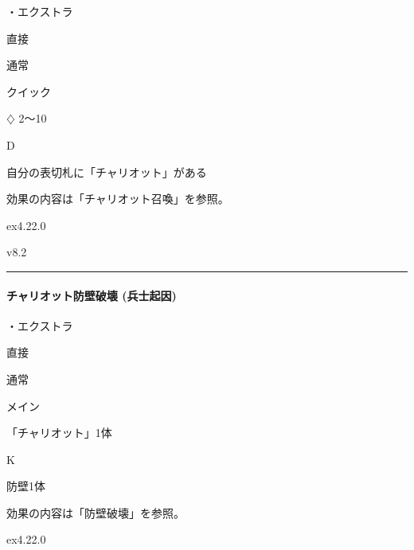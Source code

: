 \documentclass[letterpaper,10pt,dvipdfmx]{sphinxmanual}
\begin{document}
\sphinxAtStartPar
・エクストラ

\sphinxAtStartPar
{} 直接

\sphinxAtStartPar
{} 通常

\sphinxAtStartPar
{} クイック

\sphinxAtStartPar
{} {\normalsize $\diamondsuit$} 2〜10

\sphinxAtStartPar
{} D

\sphinxAtStartPar
{}

\sphinxAtStartPar
自分の表切札に「チャリオット」がある

\sphinxAtStartPar
{}

\sphinxAtStartPar
効果の内容は「チャリオット召喚」を参照。

\sphinxAtStartPar
{}  ex4.22.0

\sphinxAtStartPar
{}  v8.2


\bigskip\hrule\bigskip



\paragraph{チャリオット防壁破壊 (兵士起因)}
\label{\detokenize{auto/frameActionlist:act-chariotdestroy}}\label{\detokenize{auto/frameActionlist:id47}}
\sphinxAtStartPar
{}

\sphinxAtStartPar
・エクストラ

\sphinxAtStartPar
{} 直接

\sphinxAtStartPar
{} 通常

\sphinxAtStartPar
{} メイン

\sphinxAtStartPar
{} 「チャリオット」1体

\sphinxAtStartPar
{} K

\sphinxAtStartPar
{}

\sphinxAtStartPar
防壁1体

\sphinxAtStartPar
{}

\sphinxAtStartPar
効果の内容は「防壁破壊」を参照。

\sphinxAtStartPar
{}  ex4.22.0
\end{document}
